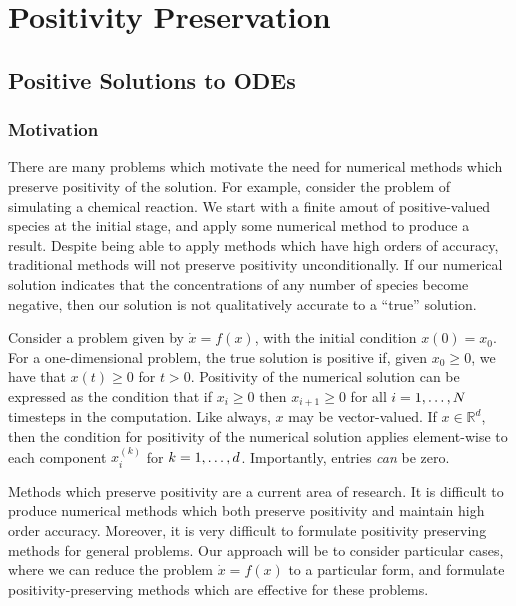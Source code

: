 

\chapter{Positivity Preservation}

\section{Positive Solutions to ODEs}

\subsection{Motivation}

There are many problems which motivate the need for numerical methods which preserve positivity of the solution.
For example, consider the problem of simulating a chemical reaction.
We start with a finite amout of positive-valued species at the initial stage, and apply some numerical method to produce a result.
Despite being able to apply methods which have high orders of accuracy, traditional methods will not preserve positivity unconditionally.
If our numerical solution indicates that the concentrations of any number of species become negative, then our solution is not qualitatively accurate to a ``true'' solution.

Consider a problem given by $\dot{x} = f(x)$, with the initial condition $x(0) = x_0$.
For a one-dimensional problem, the true solution is positive if, given $x_0 \ge 0$, we have that $x(t) \ge 0$ for $t>0$.
Positivity of the numerical solution can be expressed as the condition that if $x_i \ge 0$ then $x_{i+1} \ge 0$ for all $i = 1, \mathellipsis, N$ timesteps in the computation.
Like always, $x$ may be vector-valued. If $x \in \mathds{R}^d$,
then the condition for positivity of the numerical solution applies element-wise to each component $x_i^{(k)}$ for $k = 1, \mathellipsis, d$.
Importantly, entries \textit{can} be zero. 

Methods which preserve positivity are a current area of research. It is difficult to produce numerical methods which both preserve positivity and maintain high order accuracy.
Moreover, it is very difficult to formulate positivity preserving methods for general problems.
Our approach will be to consider particular cases, where we can reduce the problem $\dot{x} = f(x)$ to a particular form,
and formulate positivity-preserving methods which are effective for these problems.

